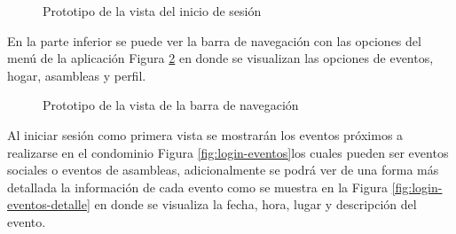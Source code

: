 \begin{figure}[H]
    \centering
    \caption{Prototipo de la vista del inicio de sesión}
    \label{fig:login-movil}
\end{figure}

En la parte inferior se puede ver la barra de navegación con las opciones del menú de la aplicación Figura \ref{fig:navegacion-movil} en donde se visualizan las opciones de eventos, hogar, asambleas y perfil.

\begin{figure}[H]
    \centering
    \caption{Prototipo de la vista de la barra de navegación}
    \label{fig:navegacion-movil}
\end{figure}

Al iniciar sesión como primera vista se mostrarán los eventos próximos a realizarse en el condominio Figura \ref{fig:login-eventos}los cuales pueden ser eventos sociales o eventos de asambleas, adicionalmente se podrá ver de una forma más detallada la información de cada evento como se muestra en la Figura \ref{fig:login-eventos-detalle} en donde se visualiza la fecha, hora, lugar y descripción del evento.

